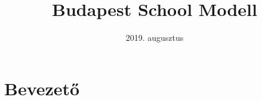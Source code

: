 \documentclass[10pt,twoside]{book}
\begin{document}
\newif\ifkerettanterv
\kerettantervtrue

\title{Budapest School Modell}
\author{}
\date{2019. augusztus}
\maketitle
%

\pagestyle{fancy}
\setcounter{page}{1}

\tableofcontents
\newpage
\setcounter{page}{1}

\pagestyle{fancy}

\chapter{Bevezető}

\end{document}

